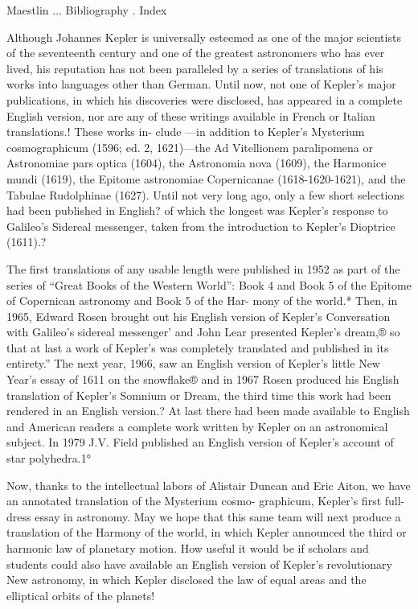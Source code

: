 \documentclass{article}
\begin{document}
Maestlin ...
Bibliography .
Index


Although Johannes Kepler is universally esteemed as one of the major
scientists of the seventeenth century and one of the greatest astronomers
who has ever lived, his reputation has not been paralleled by a series of
translations of his works into languages other than German. Until now,
not one of Kepler’s major publications, in which his discoveries were
disclosed, has appeared in a complete English version, nor are any of
these writings available in French or Italian translations.! These works in-
clude —in addition to Kepler’s Mysterium cosmographicum (1596; ed. 2,
1621)—the Ad Vitellionem paralipomena or Astronomiae pars optica
(1604), the Astronomia nova (1609), the Harmonice mundi (1619), the
Epitome astronomiae Copernicanae (1618-1620-1621), and the Tabulae
Rudolphinae (1627). Until not very long ago, only a few short selections
had been published in English? of which the longest was Kepler’s
response to Galileo’s Sidereal messenger, taken from the introduction to
Kepler’s Dioptrice (1611).?

The first translations of any usable length were published in 1952 as
part of the series of “Great Books of the Western World”: Book 4 and
Book 5 of the Epitome of Copernican astronomy and Book 5 of the Har-
mony of the world.* Then, in 1965, Edward Rosen brought out his
English version of Kepler’s Conversation with Galileo’s sidereal
messenger’ and John Lear presented Kepler’s dream,® so that at last a
work of Kepler’s was completely translated and published in its entirety.”
The next year, 1966, saw an English version of Kepler’s little New Year’s
essay of 1611 on the snowflake® and in 1967 Rosen produced his English
translation of Kepler’s Somnium or Dream, the third time this work had
been rendered in an English version.? At last there had been made
available to English and American readers a complete work written by
Kepler on an astronomical subject. In 1979 J.V. Field published an
English version of Kepler’s account of star polyhedra.1°

Now, thanks to the intellectual labors of Alistair Duncan and Eric
Aiton, we have an annotated translation of the Mysterium cosmo-
graphicum, Kepler’s first full-dress essay in astronomy. May we hope that
this same team will next produce a translation of the Harmony of the
world, in which Kepler announced the third or harmonic law of planetary
motion. How useful it would be if scholars and students could also have
available an English version of Kepler’s revolutionary New astronomy, in
which Kepler disclosed the law of equal areas and the elliptical orbits of
the planets!
\end{document}
